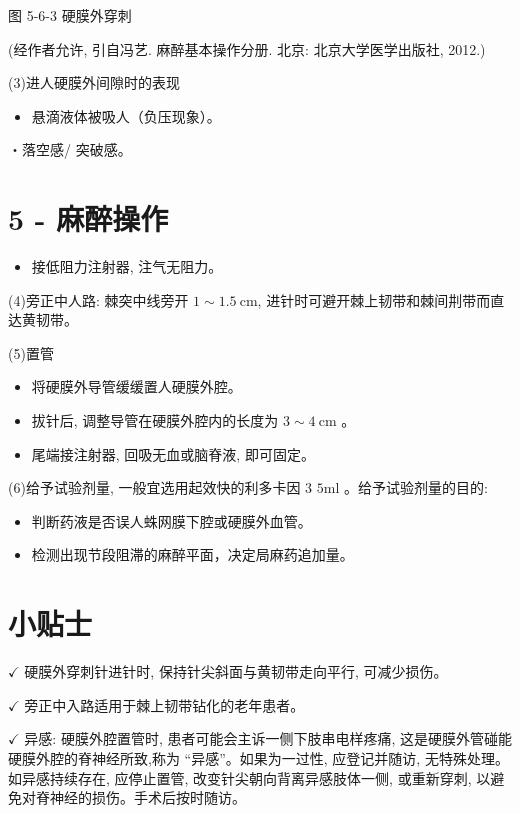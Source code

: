 \documentclass[10pt]{article}
\begin{document}
图 5-6-3 硬膜外穿刺

(经作者允许, 引自冯艺. 麻醉基本操作分册. 北京: 北京大学医学出版社, 2012.)

(3)进人硬膜外间隙时的表现

\begin{itemize}
  \item 悬滴液体被吸人（负压现象）。
\end{itemize}

・落空感/ 突破感。

\section*{5 - 麻醉操作}
\begin{itemize}
  \item 接低阻力注射器, 注气无阻力。
\end{itemize}

(4)旁正中人路: 棘突中线旁开 $1 \sim 1.5 \mathrm{~cm}$, 进针时可避开棘上韧带和棘间㓝带而直达黄韧带。

(5)置管

\begin{itemize}
  \item 将硬膜外导管缓缓置人硬膜外腔。
  \item 拔针后, 调整导管在硬膜外腔内的长度为 $3 \sim 4 \mathrm{~cm}$ 。
  \item 尾端接注射器, 回吸无血或脑脊液, 即可固定。
\end{itemize}

(6)给予试验剂量, 一般宜选用起效快的利多卡因 3 $5 \mathrm{ml}$ 。给予试验剂量的目的:

\begin{itemize}
  \item 判断药液是否误人蛛网膜下腔或硬膜外血管。
  \item 检测出现节段阻滞的麻醉平面，决定局麻药追加量。
\end{itemize}

\section*{小贴士}
$\checkmark$ 硬膜外穿刺针进针时, 保持针尖斜面与黄韧带走向平行, 可减少损伤。

$\checkmark$ 旁正中入路适用于棘上韧带钻化的老年患者。

$\checkmark$ 异感: 硬膜外腔置管时, 患者可能会主诉一侧下肢串电样疼痛, 这是硬膜外管碰能硬膜外腔的脊神经所致,称为 “异感”。如果为一过性, 应登记并随访, 无特殊处理。如异感持续存在, 应停止置管, 改变针尖朝向背离异感肢体一侧, 或重新穿刺, 以避免对脊神经的损伤。手术后按时随访。
\end{document}
